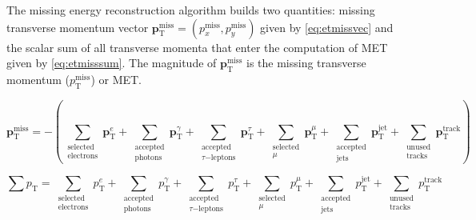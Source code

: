 The missing energy reconstruction algorithm builds two quantities: missing transverse momentum vector $\boldsymbol{p}_{\text{T}}^{\text{miss}} = (p_x^{\text{miss}},p_y^{\text{miss}})$ 
given by \cref{eq:etmissvec} and the scalar sum of all transverse momenta that enter the computation of MET
given by \cref{eq:etmisssum}. The magnitude of $\boldsymbol{p}_{\text{T}}^{\text{miss}}$ is the missing transverse momentum ($p_{\text{T}}^{\text{miss}}$) or
MET. 

\begin{equation}
    \boldsymbol{p}_\text{T}^{\text{miss}} = - \left( 
    \sum_{\substack{\mathrm{selected} \\ \mathrm{electrons}}} \boldsymbol{p}_\text{T}^e + 
    \sum_{\substack{\mathrm{accepted} \\ \mathrm{photons}}} \boldsymbol{p}_\text{T}^\gamma + 
    \sum_{\substack{\mathrm{accepted} \\ \tau \mathrm{-leptons}}} \boldsymbol{p}_\text{T}^\tau + 
    \sum_{\substack{\mathrm{selected} \\ \mu}} \boldsymbol{p}_\text{T}^\mu + 
    \sum_{\substack{\mathrm{accepted} \\ \mathrm{jets}}} \boldsymbol{p}_\text{T}^{\text{jet}} + 
    \sum_{\substack{\mathrm{unused} \\ \mathrm{tracks}}} \boldsymbol{p}_\text{T}^{\mathrm{track}} \right)
    \label{eq:etmissvec}    
\end{equation}

\begin{equation}
    \sum p_\text{T} = 
    \sum_{\substack{\mathrm{selected} \\ \mathrm{electrons}}} p_\text{T}^e + 
    \sum_{\substack{\mathrm{accepted} \\ \mathrm{photons}}} p_\text{T}^\gamma + 
    \sum_{\substack{\mathrm{accepted} \\ \tau \mathrm{-leptons}}} p_\text{T}^\tau + 
    \sum_{\substack{\mathrm{selected} \\ \mu}} p_\text{T}^\mu + 
    \sum_{\substack{\mathrm{accepted} \\ \mathrm{jets}}} p_\text{T}^{\text{jet}} + 
    \sum_{\substack{\mathrm{unused} \\ \mathrm{tracks}}} p_\text{T}^{\mathrm{track}}
    \label{eq:etmisssum}    
\end{equation}


